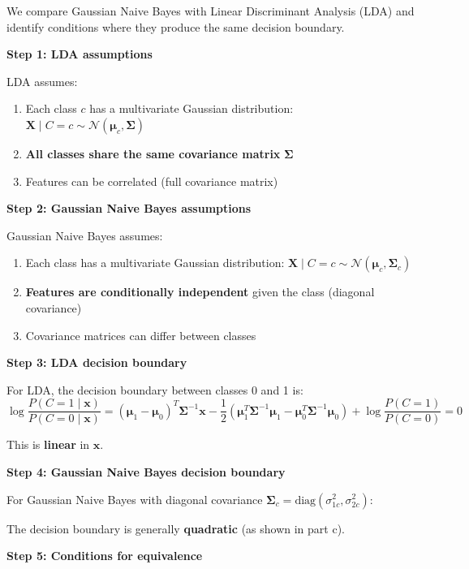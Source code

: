 \documentclass[12pt]{article}
\begin{document}
\begin{solution}
We compare Gaussian Naive Bayes with Linear Discriminant Analysis (LDA) and identify conditions where they produce the same decision boundary.

\textbf{Step 1: LDA assumptions}

LDA assumes:
\begin{enumerate}
    \item Each class $c$ has a multivariate Gaussian distribution: $\mathbf{X} \mid C=c \sim \mathcal{N}(\boldsymbol{\mu}_c, \boldsymbol{\Sigma})$
    \item \textbf{All classes share the same covariance matrix} $\boldsymbol{\Sigma}$
    \item Features can be correlated (full covariance matrix)
\end{enumerate}

\textbf{Step 2: Gaussian Naive Bayes assumptions}

Gaussian Naive Bayes assumes:
\begin{enumerate}
    \item Each class has a multivariate Gaussian distribution: $\mathbf{X} \mid C=c \sim \mathcal{N}(\boldsymbol{\mu}_c, \boldsymbol{\Sigma}_c)$
    \item \textbf{Features are conditionally independent} given the class (diagonal covariance)
    \item Covariance matrices can differ between classes
\end{enumerate}

\textbf{Step 3: LDA decision boundary}

For LDA, the decision boundary between classes 0 and 1 is:
\[
\log \frac{P(C=1 \mid \mathbf{x})}{P(C=0 \mid \mathbf{x})} = (\boldsymbol{\mu}_1 - \boldsymbol{\mu}_0)^T \boldsymbol{\Sigma}^{-1} \mathbf{x} - \frac{1}{2}(\boldsymbol{\mu}_1^T \boldsymbol{\Sigma}^{-1} \boldsymbol{\mu}_1 - \boldsymbol{\mu}_0^T \boldsymbol{\Sigma}^{-1} \boldsymbol{\mu}_0) + \log \frac{P(C=1)}{P(C=0)} = 0
\]

This is \textbf{linear} in $\mathbf{x}$.

\textbf{Step 4: Gaussian Naive Bayes decision boundary}

For Gaussian Naive Bayes with diagonal covariance $\boldsymbol{\Sigma}_c = \text{diag}(\sigma_{1c}^2, \sigma_{2c}^2)$:

The decision boundary is generally \textbf{quadratic} (as shown in part c).

\textbf{Step 5: Conditions for equivalence}


\end{solution}
\end{document}
